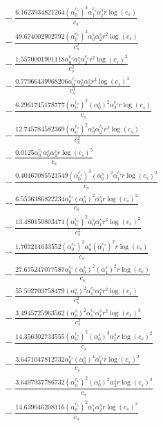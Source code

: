 \documentclass[10pt]{article}
\begin{document}
\begin{align*}
&{}  - \frac{6.1623934821264 \left(\alpha_{0}^{c_s}\right)^{3} \alpha_{1}^{c_s} \alpha_{1}^s r \log{\left(c_{s} \right)}}{c_{s}} \\
&{}  - \frac{49.674002902792 \left(\alpha_{0}^{c_s}\right)^{2} \alpha_{0}^s \alpha_{2}^s r^{2} \log{\left(c_{s} \right)}}{c_{s}^{2}} \\
&{}  - \frac{1.5570001901118 \alpha_{0}^{c_s} \alpha_{1}^s \alpha_{2}^{c_s} r^{2} \log{\left(c_{s} \right)}^{2}}{c_{s}^{2}} \\
&{}  - \frac{0.77966439968206 \alpha_{0}^{c_s} \alpha_{0}^s \alpha_{2}^s r^{3} \log{\left(c_{s} \right)}^{3}}{c_{s}^{3}} \\
&{}  - \frac{6.2961745178777 \left(\alpha_{0}^{c_s}\right)^{2} \left(\alpha_{0}^s\right)^{2} \alpha_{2}^{c_s} r \log{\left(c_{s} \right)}}{c_{s}} \\
&{}  - \frac{12.745784582369 \left(\alpha_{0}^{c_s}\right)^{2} \alpha_{0}^s \alpha_{2}^{c_s} r^{2} \log{\left(c_{s} \right)}}{c_{s}^{2}} \\
&{}  - \frac{0.0125 \alpha_{0}^{c_s} \alpha_{0}^s \alpha_{4}^s r \log{\left(c_{s} \right)}^{5}}{c_{s}} \\
&{}  - \frac{0.40167085521549 \left(\alpha_{0}^{c_s}\right)^{3} \left(\alpha_{0}^s\right)^{2} \alpha_{1}^{c_s} r \log{\left(c_{s} \right)}^{2}}{c_{s}} \\
&{}  - \frac{6.5536386822234 \alpha_{0}^{c_s} \left(\alpha_{0}^s\right)^{2} \alpha_{3}^s r \log{\left(c_{s} \right)}^{2}}{c_{s}} \\
&{}  - \frac{13.480150803471 \left(\alpha_{0}^{c_s}\right)^{2} \alpha_{0}^s \alpha_{1}^s r^{3} \log{\left(c_{s} \right)}^{2}}{c_{s}^{3}} \\
&{}  - \frac{1.707214633552 \left(\alpha_{0}^{c_s}\right)^{2} \alpha_{0}^s \left(\alpha_{1}^{c_s}\right)^{2} r \log{\left(c_{s} \right)}}{c_{s}} \\
&{}  - \frac{27.675247077587 \alpha_{0}^{c_s} \left(\alpha_{0}^s\right)^{2} \left(\alpha_{1}^s\right)^{2} r \log{\left(c_{s} \right)}}{c_{s}} \\
&{}  - \frac{55.502703758479 \left(\alpha_{0}^s\right)^{2} \alpha_{1}^{c_s} \alpha_{1}^s r^{2} \log{\left(c_{s} \right)}}{c_{s}^{2}} \\
&{}  - \frac{3.4945725963562 \left(\alpha_{0}^s\right)^{2} \alpha_{1}^{c_s} \alpha_{1}^s r^{2} \log{\left(c_{s} \right)}^{3}}{c_{s}^{2}} \\
&{}  - \frac{14.356302733555 \left(\alpha_{0}^{c_s}\right)^{2} \left(\alpha_{0}^s\right)^{3} \alpha_{1}^s r \log{\left(c_{s} \right)}^{2}}{c_{s}} \\
&{}  - \frac{3.6471047812732 \alpha_{0}^{c_s} \left(\alpha_{0}^s\right)^{4} \alpha_{1}^{c_s} r \log{\left(c_{s} \right)}^{2}}{c_{s}} \\
&{}  - \frac{3.6497937786732 \left(\alpha_{0}^{c_s}\right)^{2} \left(\alpha_{0}^s\right)^{2} \alpha_{2}^s r \log{\left(c_{s} \right)}^{3}}{c_{s}} \\
&{}  - \frac{14.639046208116 \left(\alpha_{0}^{c_s}\right)^{2} \alpha_{1}^s \alpha_{2}^s r \log{\left(c_{s} \right)}^{2}}{c_{s}}
\end{align*}
\end{document}
